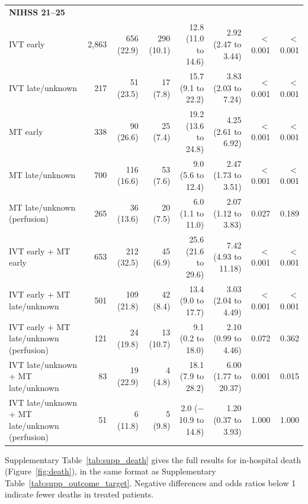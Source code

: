 \begin{landscape}
\begin{longtable}{p{5.6cm}rrrrrrr}
\multicolumn{8}{l}{\textbf{NIHSS 21--25}}\\
IVT early & 2,863 & 656 (22.9) & 290 (10.1) & 12.8 (11.0 to 14.6) & 2.92 (2.47 to 3.44) & $<$0.001 & $<$0.001 \\
IVT late/unknown & 217 & 51 (23.5) & 17 (7.8) & 15.7 (9.1 to 22.2) & 3.83 (2.03 to 7.24) & $<$0.001 & $<$0.001 \\
MT early & 338 & 90 (26.6) & 25 (7.4) & 19.2 (13.6 to 24.8) & 4.25 (2.61 to 6.92) & $<$0.001 & $<$0.001 \\
MT late/unknown & 700 & 116 (16.6) & 53 (7.6) & 9.0 (5.6 to 12.4) & 2.47 (1.73 to 3.51) & $<$0.001 & $<$0.001 \\
MT late/unknown (perfusion) & 265 & 36 (13.6) & 20 (7.5) & 6.0 (1.1 to 11.0) & 2.07 (1.12 to 3.83) & 0.027 & 0.189 \\
IVT early + MT early & 653 & 212 (32.5) & 45 (6.9) & 25.6 (21.6 to 29.6) & 7.42 (4.93 to 11.18) & $<$0.001 & $<$0.001 \\
IVT early + MT late/unknown & 501 & 109 (21.8) & 42 (8.4) & 13.4 (9.0 to 17.7) & 3.03 (2.04 to 4.49) & $<$0.001 & $<$0.001 \\
IVT early + MT late/unknown (perfusion) & 121 & 24 (19.8) & 13 (10.7) & 9.1 (0.2 to 18.0) & 2.10 (0.99 to 4.46) & 0.072 & 0.362 \\
IVT late/unknown + MT late/unknown & 83 & 19 (22.9) & 4 (4.8) & 18.1 (7.9 to 28.2) & 6.00 (1.77 to 20.37) & 0.001 & 0.015 \\
IVT late/unknown + MT late/unknown (perfusion) & 51 & 6 (11.8) & 5 (9.8) & 2.0 ($-$10.9 to 14.8) & 1.20 (0.37 to 3.93) & 1.000 & 1.000 \\
\end{longtable}
\vspace{-0.5\baselineskip}
\clearpage

{\normalsize
Supplementary Table~\ref{tab:supp_death} gives the full results for in-hospital death (Figure~\ref{fig:death}), in the same format as Supplementary Table~\ref{tab:supp_outcome_target}. Negative differences and odds ratios below 1 indicate fewer deaths in treated patients.
\par}
\bigskip


\end{landscape}
